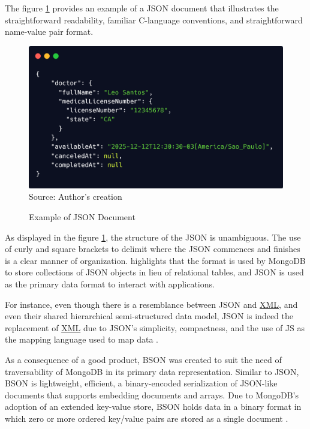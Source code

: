 The figure \ref{fig:json} provides an example of a JSON document that illustrates the straightforward readability, 
familiar C-language conventions, and straightforward name-value pair format.

\begin{figure}[H]
     \centering
     \caption{Example of JSON Document}
     \includegraphics[width=1\linewidth]{figures/json.png}
     \label{fig:json}
     \footnotesize Source: Author's creation
\end{figure}

As displayed in the figure \ref{fig:json}, the structure of the JSON is unambiguous. The use of curly and square brackets to delimit where the JSON commences and finishes is a clear manner of organization. \cite{chasseur2013enabling} highlights that the format is used by MongoDB to store collections of JSON objects in lieu of relational tables, and JSON is used as the primary data format to interact with applications.

For instance, even though there is a resemblance between JSON and \hyperref[appendix:glossary]{XML}, and even their shared hierarchical semi-structured data model, JSON is indeed the replacement of \hyperref[appendix:glossary]{XML} due to JSON's simplicity, compactness, and the use of JS as the mapping language used to map data \cite{chasseur2013enabling}.
 
 As a consequence of a good product, BSON was created to suit the need of traversability of MongoDB in its primary data representation. Similar to JSON, BSON is lightweight, efficient, a binary-encoded serialization of JSON-like documents that supports embedding documents and arrays. Due to MongoDB's adoption of an extended key-value store, BSON holds data in a binary format in which zero or more ordered key/value pairs are stored as a single document \cite{bsonspecimplementation2025, bsonspec2025, bsonspecversion112025, davoudianchenliu2018}. 
 
